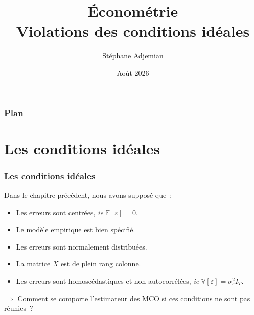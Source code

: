 \documentclass[10pt]{beamer}
\begin{document}
\title{Économétrie\\\small{Violations des conditions idéales}}
\author[S. Adjemian]{Stéphane Adjemian}
\date{Août 2026}

\begin{frame}
  \titlepage{}
\end{frame}

\begin{frame}
  \frametitle{Plan}
  \tableofcontents
\end{frame}


\section{Les conditions idéales}

\begin{frame}
  \frametitle{Les conditions idéales}

  Dans le chapitre précédent, nous avons supposé que~:\newline

  \medskip

  \begin{itemize}

  \item Les erreurs sont centrées, \textit{ie} $\mathbb E[\varepsilon]=0$.\newline

  \item Le modèle empirique est bien spécifié.\newline

  \item Les erreurs sont normalement distribuées.\newline

  \item La matrice $X$ est de plein rang colonne.\newline

  \item Les erreurs sont homoscédastiques et non autocorrélées, \textit{ie}  $\mathbb V[\varepsilon] = \sigma_{\varepsilon}^2 I_T$.\newline

  \end{itemize}

  \medskip

  $\Rightarrow$ Comment se comporte l'estimateur des MCO si ces conditions ne sont pas réunies~?

\end{frame}
\end{document}
